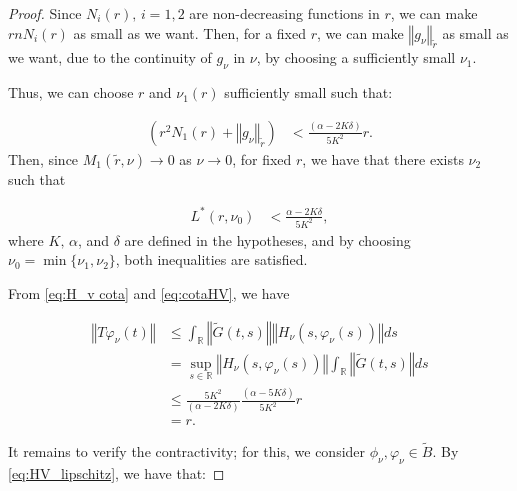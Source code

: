 \documentclass[english,reqno]{amsart}
\numberwithin{equation}{section}
\theoremstyle{plain}
\theoremstyle{definition}
\theoremstyle{remark}
\begin{document}
\begin{proof}
Since $N_{i}(r),\, i=1,2$ are non-decreasing functions in $r$, we can make $rnN_i(r)$ as small as we want. Then, for a fixed $r$, we can make $\left\Vert g_{\nu}\right\Vert_{\tilde{r}}$ as small as we want, due to the continuity of $g_\nu$ in $\nu$, by choosing a sufficiently small $\nu_1$.
 
Thus, we can choose $r$ and $\nu_{1}\left(r\right)$ sufficiently small such that:

\begin{align}
\left(r^{2}N_{1}\left(r\right)+\left\Vert g_{\nu}\right\Vert_{\tilde{r}}\right) & <\frac{\left(\alpha-2K\delta\right)}{5K^{2}}r.\label{eq:H_v cota}
\end{align}
Then, since $M_1(\tilde{r},\nu) \to 0$ as $\nu \to 0$, for fixed $r$, we have that there exists $\nu_2$ such that

\begin{align}
L^{*}(r,\nu_0) & <\frac{\alpha-2K\delta}{5K^{2}},\label{eq:H_v constantelipschitz cota}
\end{align}
where $K,\,\alpha$, and $\delta$ are defined in the hypotheses, and by choosing $\nu_0=\min\{\nu_1,\nu_2\}$, both inequalities are satisfied.

From \eqref{eq:H_v cota} and \eqref{eq:cotaHV}, we have

\begin{align*}
\left\Vert T\varphi_{\nu}\left(t\right)\right\Vert  & \leq\int_{\mathbb{R}}\left\Vert \tilde{G}\left(t,s\right)\right\Vert \left\Vert H_{\nu}\left(s,\varphi_{\nu}\left(s\right)\right)\right\Vert ds\\
 & =\sup_{s\in\mathbb{R}}\left\Vert H_{\nu}\left(s,\varphi_{\nu}\left(s\right)\right)\right\Vert \int_{\mathbb{R}}\left\Vert \tilde{G}\left(t,s\right)\right\Vert ds\\
 & \leq\frac{5K^{2}}{\left(\alpha-2K\delta\right)}\frac{\left(\alpha-5K\delta\right)}{5K^{2}}r\\
 &=r.
\end{align*}

It remains to verify the contractivity; for this, we consider $\phi_{\nu},\varphi_{\nu}\in\tilde{B}$. By \eqref{eq:HV_lipschitz}, we have that:


\end{proof}
\end{document}
